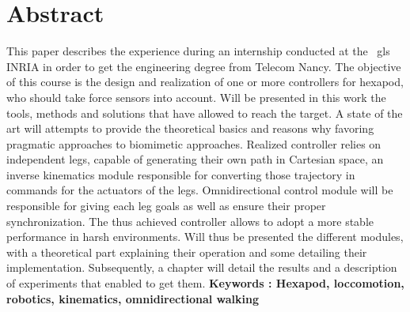\documentclass{tnreport}
\begin{document}
\section*{Abstract}
This paper describes the experience during an internship conducted at the \ gls {INRIA} in order to get the engineering degree from Telecom Nancy. The objective of this course is the design and realization of one or more controllers for hexapod, who should take force sensors into account. Will be presented in this work the tools, methods and solutions that have allowed to reach the target. A state of the art will attempts to provide the theoretical basics and reasons why favoring pragmatic approaches to biomimetic approaches. Realized controller relies on independent legs, capable of generating their own path in Cartesian space, an inverse kinematics module responsible for converting those trajectory in commands for the actuators of the legs. Omnidirectional control module will be responsible for giving each leg goals as well as ensure their proper synchronization. The thus achieved controller allows to adopt a more stable performance in harsh environments. Will thus be presented the different modules, with a theoretical part explaining their operation and some detailing their implementation. Subsequently, a chapter will detail the results and a description of experiments that enabled to get them.
{\bf Keywords : Hexapod, loccomotion, robotics, kinematics, omnidirectional walking }
\end{document}
